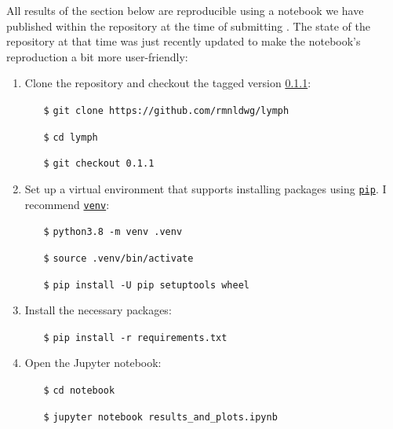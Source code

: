 \begin{tcolorbox}[
    title=\faIcon{recycle} Reproducibility,
    parbox=false,
    float
]
    All results of the section below are reproducible using a notebook we have published within the  repository at the time of submitting \cite{ludwig_hidden_2021}. The state of the repository at that time was just recently updated to make the notebook's reproduction a bit more user-friendly:

    \begin{enumerate}
        \item Clone the  repository and checkout the tagged version \href{https://github.com/rmnldwg/lymph/tree/0.1.1}{ 0.1.1}:
        \begin{itemize}[leftmargin=10mm]
            \setlength\itemsep{-0.5em}
            \item[\texttt{\$}] \verb|git clone https://github.com/rmnldwg/lymph|
            \item[\texttt{\$}] \verb|cd lymph|
            \item[\texttt{\$}] \verb|git checkout 0.1.1|
        \end{itemize}

        \item Set up a virtual environment that supports installing packages using \href{https://pypi.org/project/pip/}{\texttt{pip}}. I recommend \href{https://docs.python.org/3/library/venv.html}{\texttt{venv}}:
        \begin{itemize}[leftmargin=10mm]
            \setlength\itemsep{-0.5em}
            \item[\texttt{\$}] \verb|python3.8 -m venv .venv|
            \item[\texttt{\$}] \verb|source .venv/bin/activate|
            \item[\texttt{\$}] \verb|pip install -U pip setuptools wheel|
        \end{itemize}

        \item Install the necessary packages:
        \begin{itemize}[leftmargin=10mm]
            \setlength\itemsep{-0.5em}
            \item[\texttt{\$}] \verb|pip install -r requirements.txt|
        \end{itemize}

        \item Open the Jupyter notebook:
        \begin{itemize}[leftmargin=10mm]
            \setlength\itemsep{-0.5em}
            \item[\texttt{\$}] \verb|cd notebook|
            \item[\texttt{\$}] \verb|jupyter notebook results_and_plots.ipynb|
        \end{itemize}
    \end{enumerate}


\end{tcolorbox}
